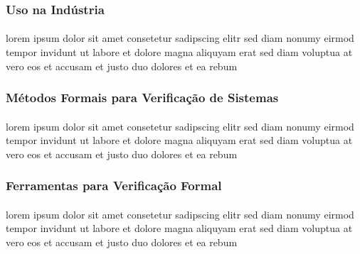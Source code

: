 \subsubsection{Uso na Indústria}
\paragraph{}
lorem ipsum dolor sit amet consetetur sadipscing elitr sed diam nonumy
eirmod tempor invidunt ut labore et dolore magna aliquyam erat sed diam
voluptua at vero eos et accusam et justo duo dolores et ea rebum

\subsubsection{Métodos Formais para Verificação de Sistemas}
\paragraph{}
lorem ipsum dolor sit amet consetetur sadipscing elitr sed diam nonumy
eirmod tempor invidunt ut labore et dolore magna aliquyam erat sed diam
voluptua at vero eos et accusam et justo duo dolores et ea rebum

\subsubsection{Ferramentas para Verificação Formal}
\paragraph{}
lorem ipsum dolor sit amet consetetur sadipscing elitr sed diam nonumy
eirmod tempor invidunt ut labore et dolore magna aliquyam erat sed diam
voluptua at vero eos et accusam et justo duo dolores et ea rebum
